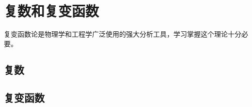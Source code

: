 


\chapter{复数和复变函数}
复变函数论是物理学和工程学广泛使用的强大分析工具，学习掌握这个理论十分必要。
\section{复数}


\section{复变函数}
\label{sec:complexfunctions}



% 